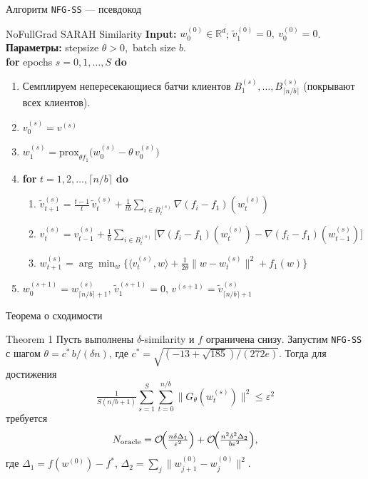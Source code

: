 \documentclass[10pt,aspectratio=169,t]{beamer}
\newcommand{\nablafi}[1]{\nabla(f_i - f_1)(#1)}
\begin{document}
\begin{frame}{Алгоритм \texttt{NFG-SS} — псевдокод}
\vspace{-1mm}
\begin{block}{NoFullGrad SARAH Similarity}
\footnotesize
\textbf{Input:} $w_0^{(0)}\in\mathbb{R}^d$;\quad
$\tilde v_1^{(0)}=0,\ v_0^{(0)}=0$.\\
\textbf{Параметры:} stepsize $\theta>0$,\ batch size $b$.\\[2pt]
\textbf{for} epochs $s = 0,1,\ldots,S$ \textbf{do}
\begin{enumerate}\setlength\itemsep{1pt}
  \item Семплируем непересекающиеся батчи клиентов $B_1^{(s)},\ldots,B_{\lceil n/b\rceil}^{(s)}$ (покрывают всех клиентов).
  \item $v_0^{(s)} = v^{(s)}\quad$ 
  \item $w_1^{(s)} = \mathrm{prox}_{\theta f_1}\bigl(w_0^{(s)} - \theta\,v_0^{(s)}\bigr)$
  \item \textbf{for} $t = 1,2,\ldots,\lceil n/b\rceil$ \textbf{do}
  \begin{enumerate}\setlength\itemsep{1pt}
    \item[(a)] $\tilde v_{t+1}^{(s)} = \frac{t-1}{t}\,\tilde v_t^{(s)} + \frac{1}{tb}\!\sum_{i\in B_t^{(s)}}\!\nablafi{w_t^{(s)}}$
    \item[(b)] $v_t^{(s)} = v_{t-1}^{(s)} + \frac{1}{b}\!\sum_{i\in B_t^{(s)}}\!\bigl[\nablafi{w_t^{(s)}} - \nablafi{w_{t-1}^{(s)}}\bigr]$
    \item[(c)] $w_{t+1}^{(s)} = \arg\min_w\bigl\{\langle v_t^{(s)},w\rangle + \tfrac{1}{2\theta}\|w - w_t^{(s)}\|^2 + f_1(w)\bigr\}$
  \end{enumerate}
  \item $w_0^{(s+1)} = w_{\lceil n/b\rceil+1}^{(s)}$,\quad
  $\tilde v_1^{(s+1)} = 0$,\quad
  $v^{(s+1)} = \tilde v_{\lceil n/b\rceil+1}^{(s)}\quad$ 
\end{enumerate}
\end{block}
\end{frame}


\begin{frame}{Теорема о сходимости}
\begin{block}{Theorem 1}
Пусть выполнены $\delta$-similarity и $f$ ограничена снизу. Запустим \texttt{NFG-SS} с шагом
$\theta = c^*\,b/(\delta n)$, где $c^* = \sqrt{(-13+\sqrt{185})/(272e)}$.
Тогда для достижения
\[
\tfrac{1}{S(n/b+1)}\!\!\sum_{s=1}^S\!\sum_{t=0}^{n/b}\!\|G_\theta(w_t^{(s)})\|^2 \le \varepsilon^2
\]
требуется
\[
N_{\mathrm{oracle}} = \mathcal{O}\!\Bigl(\tfrac{n\delta\Delta_1}{\varepsilon^2}\Bigr) + \mathcal{O}\!\Bigl(\tfrac{n^2\delta^2\Delta_2}{b\varepsilon^2}\Bigr),
\]
где $\Delta_1 = f(w^{(0)}) - f^*$, $\Delta_2 = \sum_j\|w_{j+1}^{(0)} - w_j^{(0)}\|^2$.
\end{block}
\end{frame}
\end{document}
